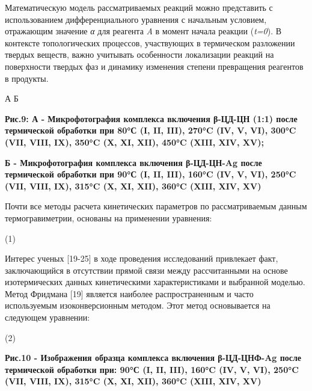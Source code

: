 Математическую модель рассматриваемых реакций можно представить с
использованием дифференциального уравнения с начальным условием,
отражающим значение \emph{α} для реагента \emph{A} в момент начала
реакции (\emph{t=0}). В контексте топологических процессов, участвующих
в термическом разложении твердых веществ, важно учитывать особенности
локализации реакций на поверхности твердых фаз и динамику изменения
степени превращения реагентов в продукты.


А Б

{\bfseries Рис.9: А - Микрофотография комплекса включения β-ЦД-ЦН (1:1)
после термической обработки при 80°С (I, II, III), 270°C (IV, V, VI),
300°C (VII, VIII, IX), 350°C (X, XI, XII), 450°C (XIII, XIV, XV);}

{\bfseries Б - Микрофотография комплекса включения β-ЦД-ЦН-Ag после
термической обработки при 90°С (I, II, III), 160°C (IV, V, VI), 250°C
(VII, VIII, IX), 315°C (X, XI, XII), 360°C (XIII, XIV, XV)}

Почти все методы расчета кинетических параметров по рассматриваемым
данным термогравиметрии, основаны на применении уравнения:

(1)

Интерес ученых {[}19-25{]} в ходе проведения исследований привлекает
факт, заключающийся в отсутствии прямой связи между рассчитанными на
основе изотермических данных кинетическими характеристиками и выбранной
моделью. Метод Фридмана {[}19{]} является наиболее распространенным и
часто используемым изоконверсионным методом. Этот метод основывается на
следующем уравнении:

(2)


{\bfseries Рис.10 - Изображения образца комплекса включения β-ЦД-ЦНФ-Ag
после термической обработки при: 90°С (I, II, III), 160°C (IV, V, VI),
250°C (VII, VIII, IX), 315°C (X, XI, XII), 360°C (XIII, XIV, XV)}

